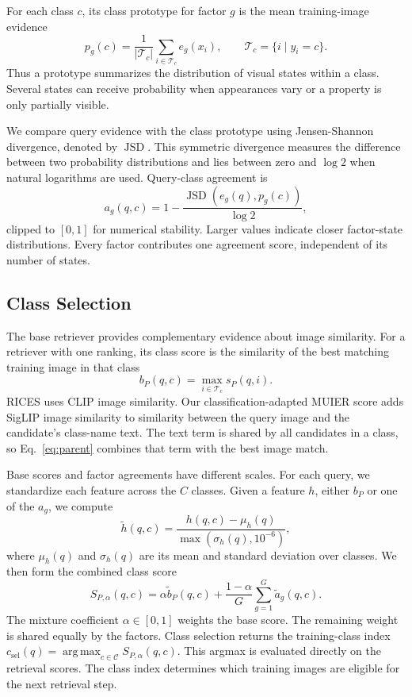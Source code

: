 \documentclass[10pt,twocolumn,letterpaper]{article}
\newcommand{\train}{\mathcal{T}}
\newcommand{\classes}{\mathcal{C}}
\newcommand{\argmax}{\operatorname*{arg\,max}}
\newcommand{\JSD}{\operatorname{JSD}}
\begin{document}
For each class $c$, its class prototype for factor $g$ is the mean training-image evidence
\begin{equation}
 p_g(c)=\frac{1}{|\train_c|}\sum_{i\in\train_c}e_g(x_i),
 \qquad \train_c=\{i\mid y_i=c\}.
 \label{eq:prototype}
\end{equation}
Thus a prototype summarizes the distribution of visual states within a class. Several states can receive probability when appearances vary or a property is only partially visible.

We compare query evidence with the class prototype using Jensen-Shannon divergence, denoted by $\JSD$. This symmetric divergence measures the difference between two probability distributions and lies between zero and $\log 2$ when natural logarithms are used. Query-class agreement is
\begin{equation}
 a_g(q,c)=1-\frac{\JSD(e_g(q),p_g(c))}{\log 2},
 \label{eq:agreement}
\end{equation}
clipped to $[0,1]$ for numerical stability. Larger values indicate closer factor-state distributions. Every factor contributes one agreement score, independent of its number of states.

\subsection{Class Selection}
\label{sec:fusion}
The base retriever provides complementary evidence about image similarity. For a retriever with one ranking, its class score is the similarity of the best matching training image in that class
\begin{equation}
 b_P(q,c)=\max_{i\in\train_c}s_P(q,i).
 \label{eq:parent}
\end{equation}
RICES uses CLIP image similarity. Our classification-adapted MUIER score adds SigLIP image similarity to similarity between the query image and the candidate's class-name text. The text term is shared by all candidates in a class, so Eq.~\ref{eq:parent} combines that term with the best image match.

Base scores and factor agreements have different scales. For each query, we standardize each feature across the $C$ classes. Given a feature $h$, either $b_P$ or one of the $a_g$, we compute
\begin{equation}
 \widetilde h(q,c)=\frac{h(q,c)-\mu_h(q)}{\max(\sigma_h(q),10^{-6})},
 \label{eq:standardize}
\end{equation}
where $\mu_h(q)$ and $\sigma_h(q)$ are its mean and standard deviation over classes. We then form the combined class score
\begin{equation}
 S_{P,\alpha}(q,c)=\alpha\widetilde b_P(q,c)
 +\frac{1-\alpha}{G}\sum_{g=1}^G\widetilde a_g(q,c).
 \label{eq:fusion}
\end{equation}
The mixture coefficient $\alpha\in[0,1]$ weights the base score. The remaining weight is shared equally by the factors. Class selection returns the training-class index $c_{\mathrm{sel}}(q)=\argmax_{c\in\classes}S_{P,\alpha}(q,c)$. This argmax is evaluated directly on the retrieval scores. The class index determines which training images are eligible for the next retrieval step.
\end{document}
